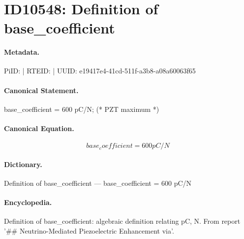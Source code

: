 \section*{ID10548: Definition of base\_coefficient}
\paragraph{Metadata.}
PiID:  | RTEID:  | UUID: e19417e4-41cd-511f-a3b8-a08a60063f65

\paragraph{Canonical Statement.}
base\_coefficient = 600 pC/N; (* PZT maximum *)

\paragraph{Canonical Equation.}
\[
base_coefficient = 600 pC/N
\]

\paragraph{Dictionary.}
Definition of base\_coefficient — base\_coefficient = 600 pC/N

\paragraph{Encyclopedia.}
Definition of base\_coefficient: algebraic definition relating pC, N. From report '\#\# Neutrino-Mediated Piezoelectric Enhancement via'.
